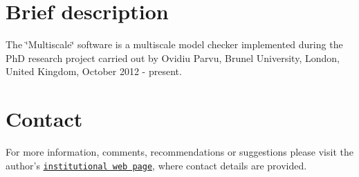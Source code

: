\hypertarget{index_sec_brief_description}{}\section{Brief description}\label{index_sec_brief_description}
The \char`\"{}\-Multiscale\char`\"{} software is a multiscale model checker implemented during the Ph\-D research project carried out by Ovidiu Parvu, Brunel University, London, United Kingdom, October 2012 -\/ present.\hypertarget{index_sec_contact}{}\section{Contact}\label{index_sec_contact}
For more information, comments, recommendations or suggestions please visit the author's \href{http://people.brunel.ac.uk/~cspgoop}{\tt institutional web page}, where contact details are provided. 